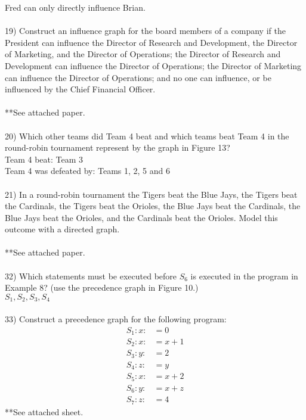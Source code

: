 \documentclass{article}
\begin{document}
\begin{flushleft}
Fred can only directly influence Brian. \\
~\\
19) Construct an influence graph for the board members of a company if the President can influence the Director of Research and Development, the Director of Marketing, and the Director of Operations; the Director of Research and Development can influence the Director of Operations; the Director of Marketing can influence the Director of Operations; and no one can influence, or be influenced by the Chief Financial Officer. \\
~\\
**See attached paper. \\
~\\
20) Which other teams did Team 4 beat and which teams beat Team 4 in the round-robin tournament represent by the graph in Figure 13? \\
Team 4 beat: Team 3 \\
Team 4 was defeated by: Teams 1, 2, 5 and 6 \\
~\\
21) In a round-robin tournament the Tigers beat the Blue Jays, the Tigers beat the Cardinals, the Tigers beat the Orioles, the Blue Jays beat the Cardinals, the Blue Jays beat the Orioles, and the Cardinals beat the Orioles.  Model this outcome with a directed graph. \\
~\\
**See attached paper. \\
~\\
32) Which statements must be executed before $S_6$ is executed in the program in Example 8? (use the precedence graph in Figure 10.) \\
$S_1, S_2, S_3, S_4$ \\
~\\
33) Construct a precedence graph for the following program: 
\begin{align*}
S_1: x :&= 0 \\
S_2: x :&= x+1 \\
S_3: y :&= 2 \\
S_4: z :&= y \\
S_5: x :&= x + 2 \\
S_6: y :&= x + z \\
S_7: z :&= 4
\end{align*}
**See attached sheet. \\

\end{flushleft}
\end{document}
